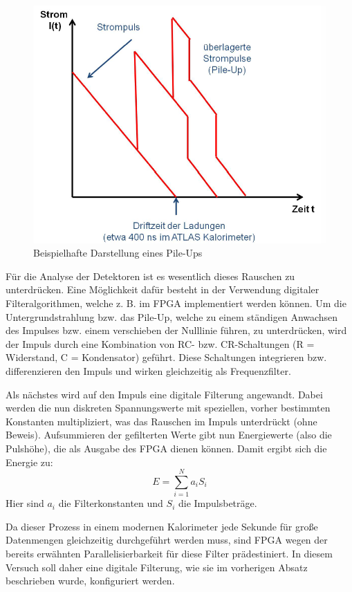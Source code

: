 \begin{figure}[h]
  \includegraphics[width=\linewidth]{../Daten/pileup.png}
  \caption{Beispielhafte Darstellung eines Pile-Ups}
  \label{pileup}
\end{figure}
Für die Analyse der Detektoren ist es wesentlich dieses Rauschen zu unterdrücken.
Eine Möglichkeit dafür besteht in der Verwendung digitaler Filteralgorithmen, welche z. B. im FPGA implementiert werden können.
Um die Untergrundstrahlung bzw. das Pile-Up, welche zu einem ständigen Anwachsen des Impulses bzw. einem verschieben der Nulllinie führen, zu unterdrücken, wird der Impuls durch eine Kombination von RC- bzw. CR-Schaltungen (R = Widerstand, C = Kondensator) geführt.
Diese Schaltungen \glqq integrieren\grqq{} bzw. \glqq differenzieren\grqq{} den Impuls und wirken gleichzeitig als Frequenzfilter.

Als nächstes wird auf den Impuls eine \glqq digitale Filterung\grqq{} angewandt.
Dabei werden die nun diskreten Spannungswerte mit speziellen, vorher bestimmten Konstanten multipliziert, was das Rauschen im Impuls unterdrückt (ohne Beweis).
Aufsummieren der gefilterten Werte gibt nun Energiewerte (also die Pulshöhe), die als Ausgabe des FPGA dienen können.
Damit ergibt sich die Energie zu:
\begin{equation}
E = \sum_{i = 1}^{N} a_i S_i
\end{equation}
Hier sind $a_i$ die Filterkonstanten und $S_i$ die Impulsbeträge.

Da dieser Prozess in einem modernen Kalorimeter jede Sekunde für große Datenmengen gleichzeitig durchgeführt werden muss, sind FPGA wegen der bereits erwähnten Parallelisierbarkeit für diese Filter prädestiniert.
In diesem Versuch soll daher eine digitale Filterung, wie sie im vorherigen Absatz beschrieben wurde, konfiguriert werden.


